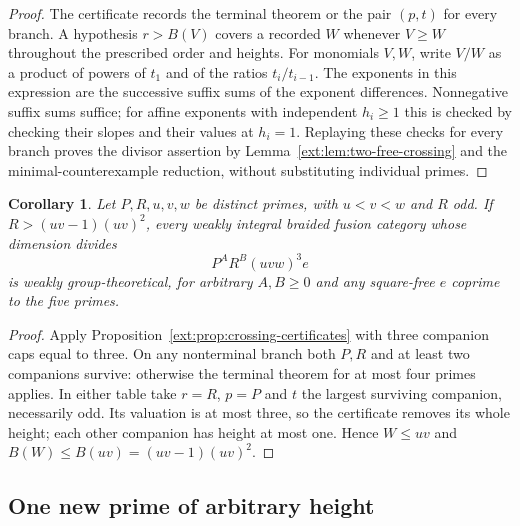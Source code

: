 \documentclass[11pt,a4paper]{article}
\numberwithin{equation}{section}
\newtheorem{corollary}[theorem]{Corollary}
\theoremstyle{remark}
\begin{document}
\begin{proof}
The certificate records the terminal theorem or the pair $(p,t)$
for every branch. A hypothesis $r>B(V)$ covers a recorded
$W$ whenever $V\ge W$ throughout the prescribed order and heights.
For monomials $V,W$, write $V/W$ as a product of powers of $t_1$
and of the ratios $t_i/t_{i-1}$. The exponents in this expression
are the successive suffix sums of the exponent differences.
Nonnegative suffix sums suffice; for affine exponents with
independent $h_i\ge1$ this is checked by checking their slopes
and their values at $h_i=1$. Replaying these checks for every
branch proves the divisor assertion by
Lemma~\ref{ext:lem:two-free-crossing} and the minimal-counterexample
reduction, without substituting individual primes.
\end{proof}

\begin{corollary}\label{ext:cor:five-two-free}
Let $P,R,u,v,w$ be distinct primes, with $u<v<w$ and $R$ odd.
If $R>(uv-1)(uv)^2$, every weakly integral braided fusion category
whose dimension divides
\[
                      P^A R^B(uvw)^3 e
\]
is weakly group-theoretical, for arbitrary $A,B\ge0$ and any
square-free $e$ coprime to the five primes.
\end{corollary}
\begin{proof}
Apply Proposition~\ref{ext:prop:crossing-certificates} with three
companion caps equal to three. On any nonterminal branch both $P,R$
and at least two companions survive: otherwise the terminal theorem
for at most four primes applies. In either table take $r=R$, $p=P$
and $t$ the largest surviving companion, necessarily odd. Its
valuation is at most three, so the certificate removes its whole
height; each other companion has height at most one. Hence $W\le uv$
and $B(W)\le B(uv)=(uv-1)(uv)^2$.
\end{proof}

\subsection{One new prime of arbitrary height}
\end{document}
